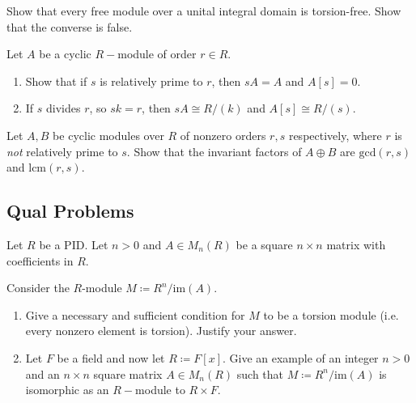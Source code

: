 \begin{problem}[Hungerford 4.6.2]
\label{prob:1.1}
Show that every free module over a unital integral domain is torsion-free. Show that the converse is false.
\end{problem}

\begin{problem}[Hungerford 4.6.3]
\label{prob:1.1}
Let $A$ be a cyclic $R-$module of order $r \in R$.
\begin{enumerate}
    \item Show that if $s$ is relatively prime to $r$, then $sA = A$ and $A[s] = 0$.
    \item If $s$ divides $r$, so $sk = r$, then $sA \cong R/(k)$ and $A[s] \cong R/(s)$.
\end{enumerate}
\end{problem}

\begin{problem}[Hungerford 4.6.6]
\label{prob:1.1}
Let $A, B$ be cyclic modules over $R$ of nonzero orders $r,s$ respectively, where $r$ is \textit{not} relatively prime to $s$. Show that the invariant factors of $A \oplus B$ are $\mathrm{gcd}(r, s)$ and $\mathrm{lcm}(r, s)$.
\end{problem}

\subsection{Qual Problems}

\begin{problem}
\label{prob:1.1}
Let $R$ be a PID. Let $n > 0$ and $A \in M_n(R)$ be a square $n\times n$ matrix with coefficients in $R$.

Consider the $R$-module $M \coloneqq R^n / \mathrm{im}(A)$.

\begin{enumerate}
    \item Give a necessary and sufficient condition for $M$ to be a torsion module (i.e. every nonzero element is torsion).
    Justify your answer.
    
    \item Let $F$ be a field and now let $R \coloneqq F[x]$. Give an example of an integer $n>0$ and an $n \times n$ square matrix $A \in M_n(R)$ such that $M \coloneqq R^n/\mathrm{im}(A)$ is isomorphic as an $R-$module to $R \times F$.
\end{enumerate}
\end{problem}

